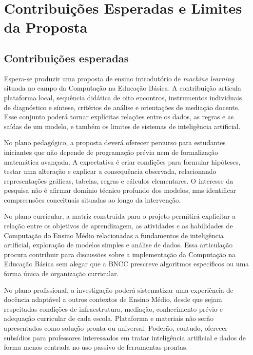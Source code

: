 \chapter{Contribuições Esperadas e Limites da Proposta}

\section{Contribuições esperadas}

Espera-se produzir uma proposta de ensino introdutório de \textit{machine learning} situada no campo da Computação na Educação Básica. A contribuição articula plataforma local, sequência didática de oito encontros, instrumentos individuais de diagnóstico e síntese, critérios de análise e orientações de mediação docente. Esse conjunto poderá tornar explícitas relações entre os dados, as regras e as saídas de um modelo, e também os limites de sistemas de inteligência artificial.

No plano pedagógico, a proposta deverá oferecer percurso para estudantes iniciantes que não depende de programação prévia nem de formalização matemática avançada. A expectativa é criar condições para formular hipóteses, testar uma alteração e explicar a consequência observada, relacionando representações gráficas, tabelas, regras e cálculos elementares. O interesse da pesquisa não é afirmar domínio técnico profundo dos modelos, mas identificar compreensões conceituais situadas ao longo da intervenção.

No plano curricular, a matriz construída para o projeto permitirá explicitar a relação entre os objetivos de aprendizagem, as atividades e as habilidades de Computação do Ensino Médio relacionadas a fundamentos de inteligência artificial, exploração de modelos simples e análise de dados. Essa articulação procura contribuir para discussões sobre a implementação da Computação na Educação Básica sem alegar que a BNCC prescreve algoritmos específicos ou uma forma única de organização curricular.

No plano profissional, a investigação poderá sistematizar uma experiência de docência adaptável a outros contextos de Ensino Médio, desde que sejam respeitadas condições de infraestrutura, mediação, conhecimento prévio e adequação curricular de cada escola. Plataforma e materiais não serão apresentados como solução pronta ou universal. Poderão, contudo, oferecer subsídios para professores interessados em tratar inteligência artificial e dados de forma menos centrada no uso passivo de ferramentas prontas.


